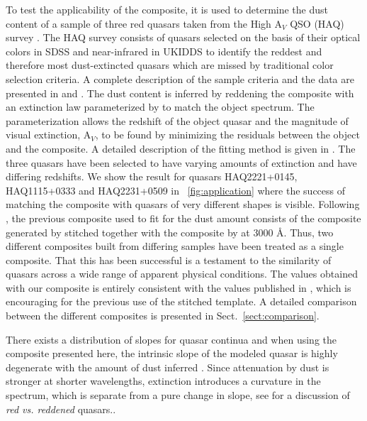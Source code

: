 \documentclass{aa}    %
\newcommand{\figref}[1]{\ref{fig:#1}}
\newcommand{\Fig}[1]{\figurename~\figref{#1}}
\newcommand{\fig}[1]{\Fig{#1}}
\newcommand{\sectionname}{Sect.}
\newcommand{\Sect}[1]{\sectionname~\ref{sect:#1}}
\newcommand{\sect}[1]{\Sect{#1}}
\begin{document}
To test the applicability of the composite, it is used to determine the dust
content of a sample of three red quasars taken from the High A$_V$ QSO (HAQ)
survey \citep{Krogager2015}. The HAQ survey consists of quasars selected on the
basis of their optical colors in SDSS and near-infrared in UKIDDS to identify
the reddest and therefore most dust-extincted quasars which are missed by
traditional color selection criteria. A complete description of the sample
criteria and the data are presented in \citet{Fynbo2013} and
\citet{Krogager2015}. The dust content is inferred by reddening the composite
with an extinction law parameterized by \citet{Gordon2003} to match the object
spectrum. The parameterization allows the redshift of the object quasar and the
magnitude of visual extinction, A$_V$, to be found by minimizing the residuals
between the object and the composite. A detailed description of the fitting
method is given in \cite{Krogager2015}.
The three quasars have been selected to have varying amounts of extinction and
have differing redshifts. We show the result for quasars HAQ2221+0145,
HAQ1115+0333 and HAQ2231+0509 in \fig{application} where the success of matching
the composite with quasars of very different shapes is visible. 
Following \cite{Wang2012}, the previous composite used to fit for the dust
amount consists of the composite generated by \cite{VandenBerk2001} stitched
together with the composite by \cite{Glikman2006} at 3000 \AA. Thus, two
different composites built from differing samples have been treated as a single
composite. That this has been successful is a testament to the similarity of
quasars across a wide range of apparent physical conditions. 
The values obtained with our composite is entirely consistent with the values
published in \cite{Krogager2015}, which is encouraging for the previous use of
the stitched template. A detailed comparison between the different composites is
presented in \sect{comparison}. 

There exists a distribution of slopes for quasar continua and when using the composite presented here, the intrinsic slope of the modeled quasar is highly degenerate with the amount of dust inferred \citep{Reichard2003a}. Since attenuation by dust is stronger at shorter wavelengths, extinction introduces a curvature in the spectrum, which is separate from a pure change in slope, see
\citet{Krawczyk2015} for a discussion of \textit{red vs. reddened} quasars.. 
\end{document}
